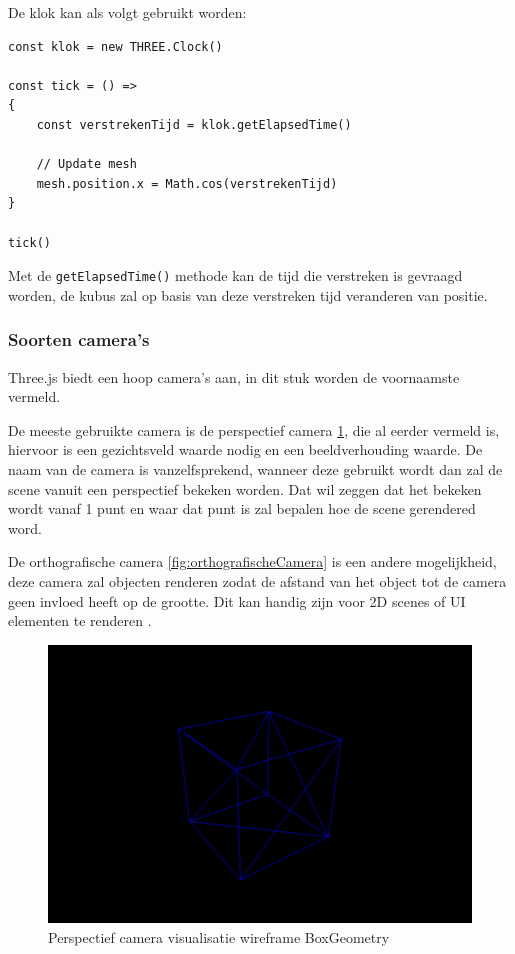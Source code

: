 De klok kan als volgt gebruikt worden:
\newpage
\begin{lstlisting}
const klok = new THREE.Clock()

const tick = () =>
{
	const verstrekenTijd = klok.getElapsedTime()
	
	// Update mesh
	mesh.position.x = Math.cos(verstrekenTijd)
}

tick()
\end{lstlisting}

Met de \texttt{getElapsedTime()} methode kan de tijd die verstreken is gevraagd worden, de kubus zal op basis van deze verstreken tijd veranderen van positie. 
\newpage
\subsubsection{Soorten camera's}

Three.js biedt een hoop camera's aan, in dit stuk worden de voornaamste vermeld.

De meeste gebruikte camera is de perspectief camera \ref{fig:perspectiefCamera}, die al eerder vermeld is, hiervoor is een gezichtsveld waarde nodig en een beeldverhouding waarde. De naam van de camera is vanzelfsprekend, wanneer deze gebruikt wordt dan zal de scene vanuit een perspectief bekeken worden. Dat wil zeggen dat het bekeken wordt vanaf 1 punt en waar dat punt is zal bepalen hoe de scene gerendered word.

De orthografische camera \ref{fig:orthografischeCamera} is een andere mogelijkheid, deze camera zal objecten renderen zodat de afstand van het object tot de camera geen invloed heeft op de grootte. Dit kan handig zijn voor 2D scenes of UI elementen te renderen \autocite{threejs2023}.

\begin{figure}[h]
	\centering
	\includegraphics[width=1\linewidth]{graphics/perspectiefCamera}
	\caption[Perspectief camera visualisatie]{Perspectief camera visualisatie wireframe BoxGeometry}
	\label{fig:perspectiefCamera}
\end{figure}

